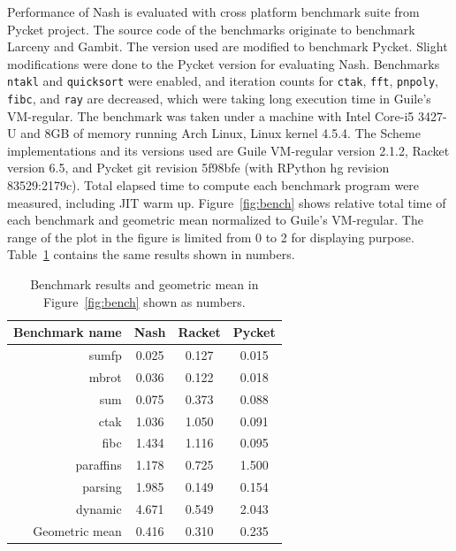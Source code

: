 \documentclass[preprint]{sigplanconf}
\begin{document}
Performance of Nash is evaluated with cross platform benchmark suite from
Pycket project. The source code of the benchmarks originate to benchmark
Larceny and Gambit. The version used are modified to benchmark Pycket. Slight
modifications were done to the Pycket version for evaluating Nash. Benchmarks
\texttt{ntakl} and \texttt{quicksort} were enabled, and iteration counts for
\texttt{ctak}, \texttt{fft}, \texttt{pnpoly}, \texttt{fibc}, and \texttt{ray}
are decreased, which were taking long execution time in Guile's
VM-regular. The benchmark was taken under a machine with Intel Core-i5 3427-U
and 8GB of memory running Arch Linux, Linux kernel 4.5.4. The Scheme
implementations and its versions used are Guile VM-regular version 2.1.2,
Racket version 6.5, and Pycket git revision 5f98bfe (with RPython hg revision
83529:2179c). Total elapsed time to compute each benchmark program were
measured, including JIT warm up. Figure~\ref{fig:bench} shows relative total
time of each benchmark and geometric mean normalized to Guile's
VM-regular. The range of the plot in the figure is limited from 0 to 2 for
displaying purpose. Table~\hyperref[tab:bench]{\ref{tab:bench}} contains the
same results shown in numbers.

\begin{table}
  \centering
  \begin{tabular}{rccc}
    \toprule
    Benchmark name & Nash & Racket & Pycket\\
    \midrule
    sumfp & 0.025 & 0.127 & 0.015 \\
    mbrot & 0.036 & 0.122 & 0.018 \\
    sum & 0.075 & 0.373 & 0.088 \\
    ctak & 1.036 & 1.050 & 0.091 \\
    fibc & 1.434 & 1.116 & 0.095 \\
    paraffins & 1.178 & 0.725 & 1.500 \\
    parsing & 1.985 & 0.149 & 0.154 \\
    dynamic & 4.671 & 0.549 & 2.043 \\
    \midrule
    Geometric mean & 0.416 & 0.310 & 0.235 \\
    \bottomrule
  \end{tabular}
  \caption{Benchmark results and geometric mean in
    Figure~\hyperref[fig:bench]{\ref{fig:bench}} shown as numbers.}
\label{tab:bench}
\end{table}
\end{document}
